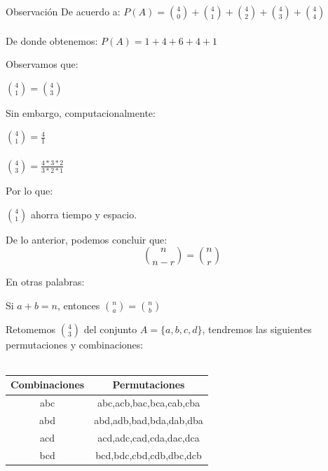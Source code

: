 \documentclass{beamer}
\begin{document}
\begin{frame}
  \begin{exampleblock}{Observaci\'on}
    De acuerdo a: 
    \centering
    $ P(A) = \binom{4}{0} + \binom{4}{1} + \binom{4}{2} + \binom{4}{3} +
    \binom{4}{4} $ \\
    \ \\
    De donde obtenemos:
    $ P(A) = 1 + 4 + 6 + 4 + 1 $
  \end{exampleblock}
  Observamos que:
  
  \begin{exampleblock}{}
    \centering
    $\binom{4}{1} = \binom{4}{3}$
  \end{exampleblock}
  
  Sin embargo, computacionalmente:

  \begin{exampleblock}{}
    \centering

    $\binom{4}{1} = \frac{4}{1}$\\
    \ \\

    $\binom{4}{3} = \frac{4*3*2}{3*2*1}$
  \end{exampleblock}
  Por lo que:
  \begin{exampleblock}{}
    \centering
    $\binom{4}{1}$ ahorra tiempo y espacio.
  \end{exampleblock}
\end{frame}

\begin{frame}
  \begin{block}{De lo anterior, podemos concluir que:}
    \begin{equation}
      \binom{n}{n-r} = \binom{n}{r}
    \end{equation}
  \end{block}
  En otras palabras:
  \begin{block}{}
    Si $a+b=n$, entonces $\binom{n}{a} = \binom{n}{b}$
  \end{block}
\end{frame}

\begin{frame}
    Retomemos $\binom{4}{3}$ del conjunto $A=\{a,b,c,d\}$, tendremos las
    siguientes permutaciones y combinaciones: \\
\ \\

\begin{center}
\begin{tabular}{cc}
   \textbf{Combinaciones } & \textbf{Permutaciones }\\
  \hline
   abc & abc,acb,bac,bca,cab,cba \\
  \hline
   abd & abd,adb,bad,bda,dab,dba \\
  \hline
   acd & acd,adc,cad,cda,dac,dca \\
  \hline
   bcd & bcd,bdc,cbd,cdb,dbc,dcb

\end{tabular}
\end{center}

\end{frame}
\end{document}
